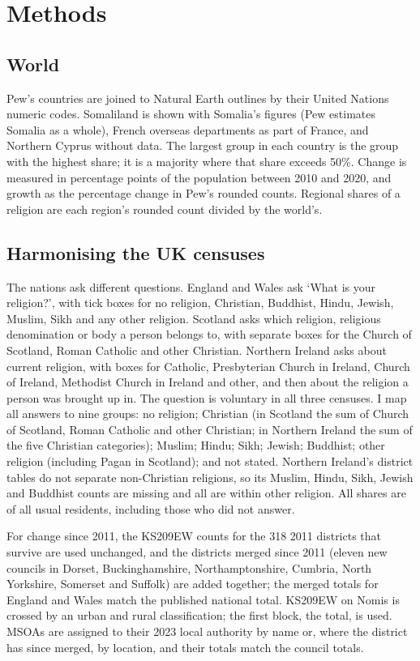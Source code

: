 \documentclass[11pt,a4paper]{article}
\begin{document}
\section{Methods}
\subsection{World}
Pew's countries are joined to Natural Earth outlines by their United Nations numeric codes. Somaliland is shown with Somalia's figures (Pew estimates Somalia as a whole), French overseas departments as part of France, and Northern Cyprus without data. The largest group in each country is the group with the highest share; it is a majority where that share exceeds 50\%. Change is measured in percentage points of the population between 2010 and 2020, and growth as the percentage change in Pew's rounded counts. Regional shares of a religion are each region's rounded count divided by the world's.

\subsection{Harmonising the UK censuses}
The nations ask different questions. England and Wales ask `What is your religion?', with tick boxes for no religion, Christian, Buddhist, Hindu, Jewish, Muslim, Sikh and any other religion. Scotland asks which religion, religious denomination or body a person belongs to, with separate boxes for the Church of Scotland, Roman Catholic and other Christian. Northern Ireland asks about current religion, with boxes for Catholic, Presbyterian Church in Ireland, Church of Ireland, Methodist Church in Ireland and other, and then about the religion a person was brought up in. The question is voluntary in all three censuses. I map all answers to nine groups: no religion; Christian (in Scotland the sum of Church of Scotland, Roman Catholic and other Christian; in Northern Ireland the sum of the five Christian categories); Muslim; Hindu; Sikh; Jewish; Buddhist; other religion (including Pagan in Scotland); and not stated. Northern Ireland's district tables do not separate non-Christian religions, so its Muslim, Hindu, Sikh, Jewish and Buddhist counts are missing and all are within other religion. All shares are of all usual residents, including those who did not answer.

For change since 2011, the KS209EW counts for the 318 2011 districts that survive are used unchanged, and the districts merged since 2011 (eleven new councils in Dorset, Buckinghamshire, Northamptonshire, Cumbria, North Yorkshire, Somerset and Suffolk) are added together; the merged totals for England and Wales match the published national total. KS209EW on Nomis is crossed by an urban and rural classification; the first block, the total, is used. MSOAs are assigned to their 2023 local authority by name or, where the district has since merged, by location, and their totals match the council totals.
\end{document}
